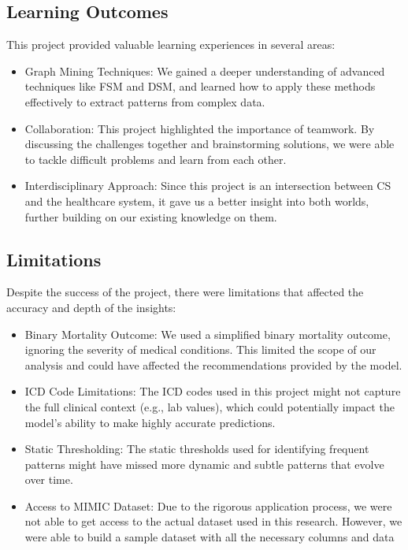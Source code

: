 \documentclass[11pt]{article}
\begin{document}
\subsection{Learning Outcomes}

This project provided valuable learning experiences in several areas:

\begin{itemize}
    \item Graph Mining Techniques: We gained a deeper understanding of advanced techniques like FSM and DSM, and learned how to apply these methods effectively to extract patterns from complex data.
    \item Collaboration: This project highlighted the importance of teamwork. By discussing the challenges together and brainstorming solutions, we were able to tackle difficult problems and learn from each other.
    \item Interdisciplinary Approach: Since this project is an intersection between CS and the healthcare system, it gave us a better insight into both worlds, further building on our existing knowledge on them.
\end{itemize}

\subsection{Limitations}

Despite the success of the project, there were limitations that affected the accuracy and depth of the insights:

\begin{itemize}
    \item Binary Mortality Outcome: We used a simplified binary mortality outcome, ignoring the severity of medical conditions. This limited the scope of our analysis and could have affected the recommendations provided by the model.
    \item ICD Code Limitations: The ICD codes used in this project might not capture the full clinical context (e.g., lab values), which could potentially impact the model's ability to make highly accurate predictions.
    \item Static Thresholding: The static thresholds used for identifying frequent patterns might have missed more dynamic and subtle patterns that evolve over time.
    \item Access to MIMIC Dataset: Due to the rigorous application process, we were not able to get access to the actual dataset used in this research. However, we were able to build a sample dataset with all the necessary columns and data
\end{itemize}
\end{document}
